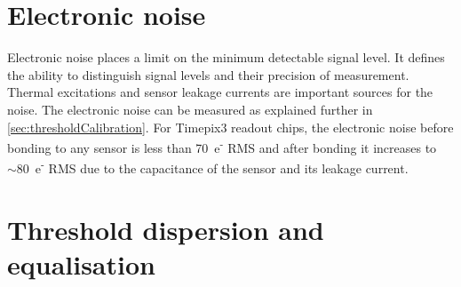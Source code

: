 \begin{table}[htbp]
  \centering
  \caption{Details of different Advacam planar pixel sensors
    bump-bonded to Timepix3 readout ASICs and studied in calibration
    and test beams. For active-edge sensors, the edge distance is
    defined by the distance between the last pixel implant and the
    physical sensor edge (see \cref{ch:ActiveEdgeSensors}).}
  \label{tab:Timepix3Assemblies}
\end{table}

\section{Electronic noise}
\label{sec:noise}

Electronic noise places a limit on the minimum detectable signal
level. It defines the ability to distinguish signal levels and their
precision of measurement. Thermal excitations and sensor leakage
currents are important sources for the noise. The electronic noise can
be measured as explained further in
\cref{sec:thresholdCalibration}. For Timepix3 readout chips, the
electronic noise before bonding to any sensor is less than
70~e\textsuperscript{-} RMS and after bonding it increases to
$\sim80$~e\textsuperscript{-} RMS due to the capacitance of the sensor
and its leakage current.

\section{Threshold dispersion and equalisation} 
\label{sec:ThresholdEqualisation}



